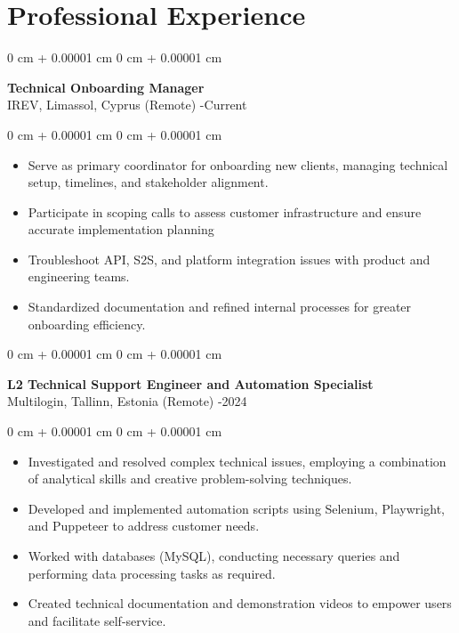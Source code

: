 \documentclass[10pt, letterpaper]{article}
\newenvironment{highlights}{
    \begin{itemize}[
        topsep=0.10 cm,
        parsep=0.10 cm,
        partopsep=0pt,
        itemsep=0pt,
        leftmargin=0 cm + 10pt
    ]
}{
    \end{itemize}
}
\newenvironment{onecolentry}{
    \begin{adjustwidth}{
        0 cm + 0.00001 cm
    }{
        0 cm + 0.00001 cm
    }
}{
    \end{adjustwidth}
}
\begin{document}
\section{Professional Experience}

\begin{onecolentry}
    \setcolumnwidth{\fill, 4.5cm}
    \begin{paracol}{2}
        \textbf{Technical Onboarding Manager} \\ IREV, Limassol, Cyprus (Remote)
        \switchcolumn
        -Current
    \end{paracol}
\end{onecolentry}
\vspace{0.10cm}
\begin{onecolentry}
    \begin{highlights}
                \item Serve as primary coordinator for onboarding new clients, managing technical setup, timelines, and stakeholder alignment.
                \item Participate in scoping calls to assess customer infrastructure and ensure accurate implementation planning
                \item Troubleshoot API, S2S, and platform integration issues with product and engineering teams.
                \item Standardized documentation and refined internal processes for greater onboarding efficiency.
    \end{highlights}
\end{onecolentry}

\vspace{0.2cm}

\begin{onecolentry}
    \setcolumnwidth{\fill, 4.5cm}
    \begin{paracol}{2}
        \textbf{L2 Technical Support Engineer and Automation Specialist} \\ Multilogin, Tallinn, Estonia (Remote)
        \switchcolumn
        -2024
    \end{paracol}
\end{onecolentry}
\vspace{0.10cm}
\begin{onecolentry}
    \begin{highlights}
                \item Investigated and resolved complex technical issues, employing a combination of analytical skills and creative problem-solving techniques.
                \item Developed and implemented automation scripts using Selenium, Playwright, and Puppeteer to address customer needs.
                \item Worked with databases (MySQL), conducting necessary queries and performing data processing tasks as required.
                \item Created technical documentation and demonstration videos to empower users and facilitate self-service.
    \end{highlights}
\end{onecolentry}
\end{document}
